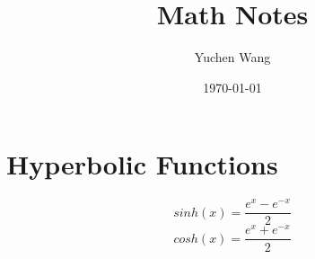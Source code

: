 \documentclass[11pt]{article}
\title{Math Notes}
\author{Yuchen Wang}
\date{\today}
\begin{document}
	\maketitle
\section{Hyperbolic Functions} 
$$sinh(x) = \frac{e^x - e^{-x}}{2}$$
$$cosh(x) = \frac{e^x + e^{-x}}{2}$$
\end{document}
